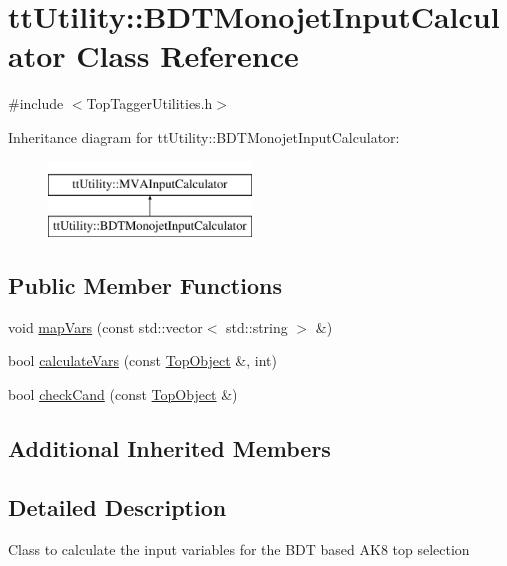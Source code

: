 \hypertarget{classttUtility_1_1BDTMonojetInputCalculator}{\section{tt\-Utility\-:\-:B\-D\-T\-Monojet\-Input\-Calculator Class Reference}
\label{classttUtility_1_1BDTMonojetInputCalculator}
}


{\ttfamily \#include $<$Top\-Tagger\-Utilities.\-h$>$}

Inheritance diagram for tt\-Utility\-:\-:B\-D\-T\-Monojet\-Input\-Calculator\-:\begin{figure}[H]
\begin{center}
\leavevmode
\includegraphics[height=2.000000cm]{classttUtility_1_1BDTMonojetInputCalculator}
\end{center}
\end{figure}
\subsection*{Public Member Functions}
\begin{DoxyCompactItemize}
\item 
void \hyperlink{classttUtility_1_1BDTMonojetInputCalculator_af929778a33ce64a1c5102712a2858aa0}{map\-Vars} (const std\-::vector$<$ std\-::string $>$ \&)
\item 
bool \hyperlink{classttUtility_1_1BDTMonojetInputCalculator_ade65c192d67eb363a4b4028b4f0ec7c5}{calculate\-Vars} (const \hyperlink{classTopObject}{Top\-Object} \&, int)
\item 
bool \hyperlink{classttUtility_1_1BDTMonojetInputCalculator_aabe30d40a85c15a5c4df89f39b44be88}{check\-Cand} (const \hyperlink{classTopObject}{Top\-Object} \&)
\end{DoxyCompactItemize}
\subsection*{Additional Inherited Members}


\subsection{Detailed Description}
Class to calculate the input variables for the B\-D\-T based A\-K8 top selection 

